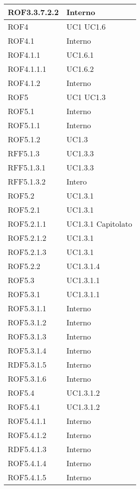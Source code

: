 \begin{center}
\begin{longtable}{| p{4cm} | p{4cm} |}
\hline
ROF3.3.7.2.2   &  Interno \\
\hline
ROF4   &  UC1 \newline UC1.6 \\
\hline
ROF4.1   &  Interno \\
\hline
ROF4.1.1   &  UC1.6.1 \\
\hline
ROF4.1.1.1   &  UC1.6.2 \\
\hline
ROF4.1.2   &  Interno \\
\hline
ROF5   &  UC1 \newline UC1.3 \\
\hline
ROF5.1   &  Interno \\
\hline
ROF5.1.1   &  Interno \\
\hline
ROF5.1.2   &  UC1.3 \\
\hline
RFF5.1.3   &  UC1.3.3 \\
\hline
RFF5.1.3.1   &  UC1.3.3 \\
\hline
RFF5.1.3.2   &  Intero \\
\hline
ROF5.2   &  UC1.3.1 \\
\hline
ROF5.2.1   &  UC1.3.1 \\
\hline
ROF5.2.1.1   &  UC1.3.1 \newline Capitolato \\
\hline
ROF5.2.1.2   &  UC1.3.1 \\
\hline
ROF5.2.1.3   &  UC1.3.1 \\
\hline
ROF5.2.2   &  UC1.3.1.4  \\
\hline
ROF5.3   &  UC1.3.1.1 \\
\hline
ROF5.3.1   &  UC1.3.1.1  \\
\hline
ROF5.3.1.1   &  Interno \\
\hline
ROF5.3.1.2   &  Interno \\
\hline
ROF5.3.1.3   &  Interno \\
\hline
ROF5.3.1.4   &  Interno \\
\hline
RDF5.3.1.5   &  Interno \\
\hline
ROF5.3.1.6   &  Interno \\
\hline
ROF5.4   &  UC1.3.1.2  \\
\hline
ROF5.4.1   &  UC1.3.1.2  \\
\hline
ROF5.4.1.1   &  Interno \\
\hline
ROF5.4.1.2   &  Interno \\
\hline
RDF5.4.1.3   &  Interno \\
\hline
ROF5.4.1.4   &  Interno \\
\hline
ROF5.4.1.5   &  Interno \\

\end{longtable}
\end{center}
